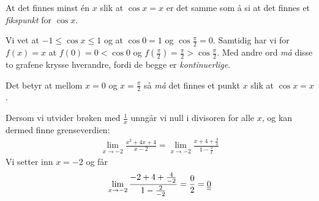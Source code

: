 \documentclass[a4paper,norsk,12pt]{article}
\begin{document}
At det finnes minst én $x$ slik at $\cos{x}=x$ er det samme som å si at det
finnes et \textit{fikspunkt} for $\cos{x}$.

Vi vet at $-1 \leq \cos{x} \leq 1$ og at $\cos{0} = 1$ og $\cos{\frac{\pi}{2}}
= 0$. Samtidig har vi for $f(x)=x$ at $f(0) = 0 < \cos{0}$ og $f(\frac{\pi}{2})
= \frac{\pi}{2} > \cos{\frac{\pi}{2}}$. Med andre ord \textit{må} disse to
grafene krysse hverandre, fordi de begge er \textit{kontinuerlige}.

Det betyr at mellom $x=0$ og $x=\frac{\pi}{2}$ så \textit{må} det finnes et punkt $x$
slik at $\cos{x} = x$.


Dersom vi utvider brøken med $\frac{1}{x}$ unngår vi null i divisoren for alle
$x$, og kan dermed finne grenseverdien:
\begin{equation*}
\begin{split}
  \lim_{x \to -2}{\frac{x^2+4x+4}{x-2}} = \lim_{x \to -2}\frac{x+4+\frac{4}{x}}{1-\frac{2}{x}}
\end{split}
\end{equation*}
Vi setter inn $x=-2$ og får
\begin{equation*}
\begin{split}
  \lim_{x \to -2}\frac{-2+4+\frac{4}{-2}}{1-\frac{2}{-2}} =
  \frac{0}{2} = {\underline{\underline{0}}}
\end{split}
\end{equation*}
\end{document}
